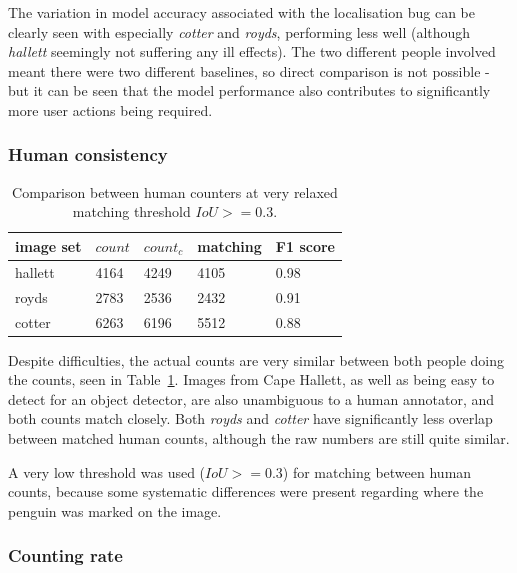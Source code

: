 The variation in model accuracy associated with the localisation bug can be clearly seen with especially \emph{cotter} and \emph{royds}, performing less well (although \emph{hallett} seemingly not suffering any ill effects). The two different people involved meant there were two different baselines, so direct comparison is not possible - but it can be seen that the model performance also contributes to significantly more user actions being required.


\subsubsection{Human consistency}

\begin{table}[th!]
    \centering
\caption{Comparison between human counters at very relaxed matching threshold $IoU >= 0.3$. }    
\begin{tabular}{lllll}
image set & $count$ & $count_c$ & matching & F1 score \\
\toprule
hallett   & 4164      & 4249      & 4105     & 0.98     \\
royds     & 2783      & 2536      & 2432     & 0.91     \\
cotter    & 6263      & 6196      & 5512     & 0.88 \\
\bottomrule
\end{tabular}
\label{tab:human_comparison} 
\end{table}
 
Despite difficulties, the actual counts are very similar between both people doing the counts, seen in Table~\ref{tab:human_comparison}. Images from Cape Hallett, as well as being easy to detect for an object detector, are also unambiguous to a human annotator, and both counts match closely. Both \emph{royds} and \emph{cotter} have significantly less overlap between matched human counts, although the raw numbers are still quite similar.

A very low threshold was used ($IoU >= 0.3$) for matching between human counts, because some systematic differences were present regarding where the penguin was marked on the image.

\subsubsection {Counting rate}

